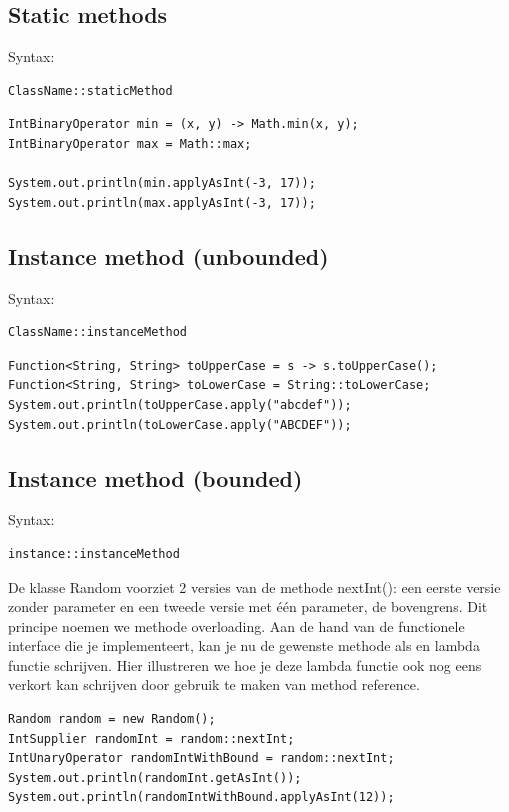 \documentclass{tstextbook}
\begin{document}
\subsection{Static methods}
Syntax: 
\begin{verbatim}
ClassName::staticMethod
\end{verbatim}

\begin{lstlisting}
IntBinaryOperator min = (x, y) -> Math.min(x, y);
IntBinaryOperator max = Math::max;

System.out.println(min.applyAsInt(-3, 17));
System.out.println(max.applyAsInt(-3, 17));
\end{lstlisting}



\subsection{Instance method (unbounded)}
Syntax:
\begin{verbatim}
ClassName::instanceMethod
\end{verbatim}

\begin{lstlisting}
Function<String, String> toUpperCase = s -> s.toUpperCase();
Function<String, String> toLowerCase = String::toLowerCase;
System.out.println(toUpperCase.apply("abcdef"));
System.out.println(toLowerCase.apply("ABCDEF"));
\end{lstlisting}

\subsection{Instance method (bounded)}

Syntax:
\begin{verbatim}
instance::instanceMethod
\end{verbatim}

De klasse Random voorziet 2 versies van de methode nextInt(): een eerste versie zonder parameter en een tweede versie met \'e\'en parameter, de bovengrens. Dit principe noemen we methode overloading. Aan de hand van de functionele interface die je implementeert, kan je nu de gewenste methode als en lambda functie schrijven. Hier illustreren we hoe je deze lambda functie ook nog eens verkort kan schrijven door gebruik te maken van method reference.

\begin{lstlisting}
Random random = new Random();
IntSupplier randomInt = random::nextInt;
IntUnaryOperator randomIntWithBound = random::nextInt;
System.out.println(randomInt.getAsInt());
System.out.println(randomIntWithBound.applyAsInt(12));
\end{lstlisting}
\end{document}
